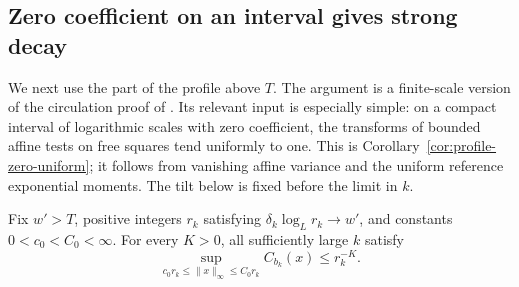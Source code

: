 \subsection{Zero coefficient on an interval gives strong decay}

We next use the part of the profile above \(T\).  The argument is a
finite-scale version of the circulation proof of
\cite[Proposition~2.6]{X}.  Its relevant input is especially simple:
on a compact interval of logarithmic scales with zero coefficient,
the transforms of bounded affine tests on free squares tend
uniformly to one.  This is
Corollary~\ref{cor:profile-zero-uniform}; it follows from vanishing
affine variance and the uniform reference exponential moments.
The tilt below is fixed before the limit in \(k\).

\begin{proposition}\label{prop:mass-polynomial}
Fix \(w'>T\), positive integers \(r_k\) satisfying
\(\delta_k\log_Lr_k\to w'\), and constants \(0<c_0<C_0<\infty\).
For every \(K>0\), all sufficiently large \(k\) satisfy
\begin{equation}\label{eq:mass-polynomial}
 \sup_{c_0r_k\le\|x\|_\infty\le C_0r_k}C_{b_k}(x)
                                      \le r_k^{-K}.
\end{equation}
\end{proposition}

